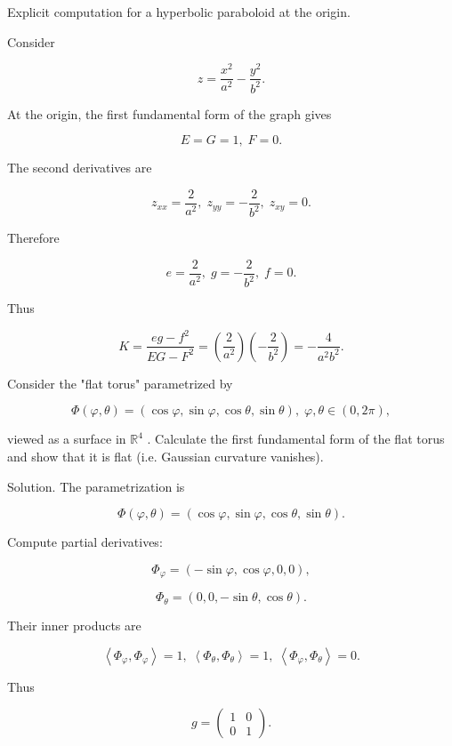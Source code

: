 \documentclass[10pt]{article}
\begin{document}
Explicit computation for a hyperbolic paraboloid at the origin.

Consider

\[
z = \frac{{x}^{2}}{{a}^{2}} - \frac{{y}^{2}}{{b}^{2}}.
\]

At the origin, the first fundamental form of the graph gives

\[
E = G = 1,\;F = 0.
\]

The second derivatives are

\[
{z}_{xx} = \frac{2}{{a}^{2}},\;{z}_{yy} =  - \frac{2}{{b}^{2}},\;{z}_{xy} = 0.
\]

Therefore

\[
e = \frac{2}{{a}^{2}},\;g =  - \frac{2}{{b}^{2}},\;f = 0.
\]

Thus

\[
K = \frac{{eg} - {f}^{2}}{{EG} - {F}^{2}} = \left( \frac{2}{{a}^{2}}\right) \left( {-\frac{2}{{b}^{2}}}\right)  =  - \frac{4}{{a}^{2}{b}^{2}}.
\]

\begin{problem}[title=PROBLEM 3 (4 POINTS)]
Consider the "flat torus" parametrized by

\[
\Phi \left( {\varphi ,\theta }\right)  = \left( {\cos \varphi ,\sin \varphi ,\cos \theta ,\sin \theta }\right) ,\;\varphi ,\theta  \in  \left( {0,{2\pi }}\right) ,
\]

viewed as a surface in \({\mathbb{R}}^{4}\) . Calculate the first fundamental form of the flat torus and show that it is flat (i.e. Gaussian curvature vanishes).
\end{problem}

Solution. The parametrization is

\[
\Phi \left( {\varphi ,\theta }\right)  = \left( {\cos \varphi ,\sin \varphi ,\cos \theta ,\sin \theta }\right) .
\]

Compute partial derivatives:

\[
{\Phi }_{\varphi } = \left( {-\sin \varphi ,\cos \varphi ,0,0}\right) ,
\]

\[
{\Phi }_{\theta } = \left( {0,0, - \sin \theta ,\cos \theta }\right) .
\]

Their inner products are

\[
\left\langle  {{\Phi }_{\varphi },{\Phi }_{\varphi }}\right\rangle   = 1,\;\left\langle  {{\Phi }_{\theta },{\Phi }_{\theta }}\right\rangle   = 1,\;\left\langle  {{\Phi }_{\varphi },{\Phi }_{\theta }}\right\rangle   = 0.
\]

Thus

\[
g = \left( \begin{array}{ll} 1 & 0 \\  0 & 1 \end{array}\right) .
\]
\end{document}
